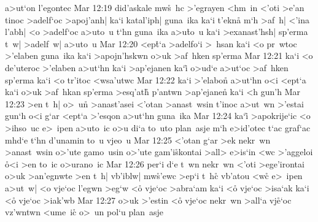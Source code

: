 a>ut`on
l'egontec\bibvsend
\vs Mar 12:19
did'askale
mw\r{s}~hc
>'egrayen
<hm~in
<'oti
>e'an
tinoc
>adelf`oc
>apoj'anh|
ka`i
katal'iph|
guna~ika
ka`i
t'ekna\r{}
m`h
>af~h|
<'ina
l'abh|
<o
>adelf`oc
a>uto~u
t`hn
guna~ika
a>u\r{t}o~u
ka`i
>exanast'hsh|
sp'erma
t~w|
>adelf~w|
a>uto~u\bibvsend
\vs Mar 12:20
<ep\r{t}`a
>adelfo`i
>~hsan
ka`i
<o
pr~wtoc
>'elaben
guna~ika
ka`i
>apojn'hskwn
o>uk
>af~hken
sp'erma\bibvsend
\vs Mar 12:21
ka`i
<o
de'uteroc
>'elaben
a>ut`hn
ka`i
>ap'ejanen
ka`i\r{}
o>ud`e
a>ut`oc
>af~hken
sp'erma
ka`i
<o
tr'itoc
<wsa'utwc\bibvsend
\vs Mar 12:22
ka`i
>'elabon\r{}
a>ut`hn
o<i
<ept`a
ka`i
o>uk
>af~hkan
sp'erma
>esq'at\r{h}
p'antwn
>ap'ejanen\r{}
ka`i
<h
gun'h\bibvsend
\vs Mar 12:23
>en
t~h|
o>~u\r{n}
>anast'asei
<'otan
>anast~wsin
t'inoc
a>ut~wn
>'estai
gun`h
o<i
g`ar
<ept`a
>'esqon
a>ut`hn
guna~ika\bibvsend
\vs Mar 12:24
ka`i\r{}
>apokrije`ic
<o
>ihso~uc
e>~ipen
a>uto~ic
o>u
di`a
to~uto
plan~asje
m`h
e>id'otec
t`ac
graf`ac
mhd`e
t`hn
d'unamin
to~u
vjeo~u\bibvsend
\vs Mar 12:25
<'otan
g`ar
>ek
nekr~wn
>anast~wsin
o>'ute
gamo~usin
o>'ute
gam'i\r{s}kontai
>all>
e>is`in
<wc
>'aggeloi
\r{o}<i
>en
to~ic
o>urano~ic\bibvsend
\vs Mar 12:26
per`i
d`e
t~wn
nekr~wn
<'oti
>ege'irontai
o>uk
>an'egnwte
>en
t~h|
vb'iblw|
mw\r{s}'ewc
>ep`i
t~h\r{c}
vb'atou
<w\r{c}
e>~ipen
a>ut~w|
<o
vje`oc
l'egwn
>eg`w
<o\r{}
vje`oc
>abra`am
ka`i
<o\r{}
vje`oc
>isa`ak
ka`i
<o\r{}
vje`oc
>iak'wb\bibvsend
\vs Mar 12:27
o>uk
>'estin
<o\r{}
vje`oc
nekr~wn
>all`a
vj\r{e}`oc
vz'wntwn
<ume~ic\r{}
o>~un
pol`u
plan~asje\bibvsend
